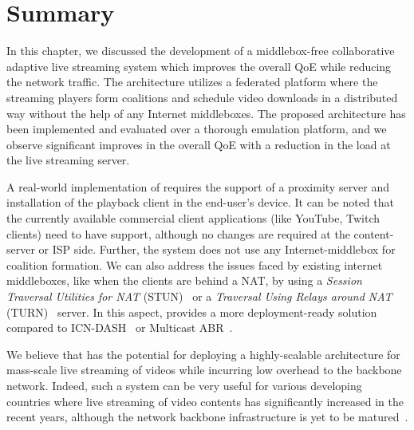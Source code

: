 \section{Summary}
In this chapter, we discussed the development of a middlebox-free collaborative adaptive live streaming system which improves the overall \ac{QoE} while reducing the network traffic. The architecture utilizes a federated platform where the streaming players form coalitions and schedule video downloads in a distributed way without the help of any Internet middleboxes. The proposed architecture has been implemented and evaluated over a thorough emulation platform, and we observe significant improves in the overall QoE with a reduction in the load at the live streaming server. 

A real-world implementation of {\our} requires the support of a proximity server and installation of the playback client in the end-user's device. It can be noted that the currently available commercial client applications (like YouTube, Twitch clients) need to have {\our} support, although no changes are required at the content-server or ISP side. Further, the system does not use any Internet-middlebox for coalition formation. We can also address the issues faced by existing internet middleboxes, like when the clients are behind a NAT, by using a \textit{Session Traversal Utilities for NAT} (STUN)~\cite{rfc5389_stun} or a \textit{Traversal Using Relays around NAT} (TURN)~\cite{rfc5766_turn} server. In this aspect, {\our} provides a more deployment-ready solution compared to ICN-DASH~\cite{ICN-DASH} or Multicast ABR~\cite{multicastAbrCablelabs}.

We believe that {\our} has the potential for deploying a highly-scalable architecture for mass-scale live streaming of videos while incurring low overhead to the backbone network. Indeed, such a system can be very useful for various developing countries where live streaming of video contents has significantly increased in the recent years, although the network backbone infrastructure is yet to be matured~\cite{kiedanski2019youtube}.
